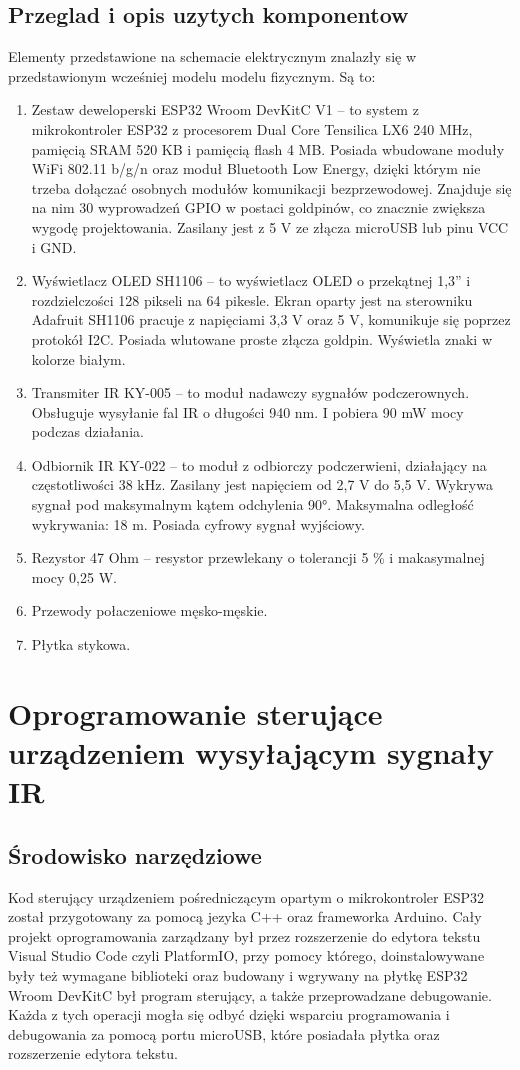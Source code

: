 \documentclass[12pt,twoside]{article}
\begin{document}
\subsection{Przeglad i opis uzytych komponentow}
Elementy przedstawione na schemacie elektrycznym znalazły się w przedstawionym wcześniej modelu modelu fizycznym. Są to:
\begin{enumerate}[label=\alph*), leftmargin=1.25cm]
   \item Zestaw deweloperski ESP32 Wroom DevKitC V1\cite{doitDevKitV1} -- to system z mikrokontroler ESP32 z procesorem Dual Core Tensilica LX6 240 MHz, pamięcią SRAM 520 KB i pamięcią flash 4 MB. Posiada wbudowane moduły WiFi 802.11 b/g/n oraz moduł Bluetooth Low Energy, dzięki którym nie trzeba dołączać osobnych modułów komunikacji bezprzewodowej. Znajduje się na nim 30 wyprowadzeń GPIO w postaci goldpinów, co znacznie zwiększa wygodę projektowania. Zasilany jest z 5 V ze złącza microUSB lub pinu VCC i GND.
   \item Wyświetlacz OLED SH1106\cite{sh1106} -- to wyświetlacz OLED o przekątnej 1,3'' i rozdzielczości 128 pikseli na 64 pikesle. Ekran oparty jest na sterowniku Adafruit SH1106 pracuje z napięciami 3,3 V oraz 5 V, komunikuje się poprzez protokół I2C. Posiada wlutowane proste złącza goldpin. Wyświetla znaki w kolorze białym.
   \item Transmiter IR KY-005\cite{ky005} -- to moduł nadawczy sygnałów podczerownych. Obsługuje wysyłanie fal IR o długości 940 nm. I pobiera 90 mW mocy podczas działania.
   \item Odbiornik IR KY-022\cite{ky022}  -- to moduł z odbiorczy podczerwieni, działający na częstotliwości 38 kHz. Zasilany jest napięciem od 2,7 V do 5,5 V. Wykrywa sygnał pod maksymalnym kątem odchylenia 90°. Maksymalna odległość wykrywania: 18 m. Posiada cyfrowy sygnał wyjściowy.
   \item Rezystor 47 Ohm -- resystor przewlekany o tolerancji 5 \% i makasymalnej mocy 0,25 W.
   \item Przewody połaczeniowe męsko-męskie.
   \item Płytka stykowa.
\end{enumerate}

\clearpage

\section{Oprogramowanie sterujące urządzeniem wysyłającym sygnały IR}
\subsection{Środowisko narzędziowe}
Kod sterujący urządzeniem pośredniczącym opartym o mikrokontroler ESP32 został przygotowany za pomocą jezyka C++ oraz frameworka Arduino. Cały projekt oprogramowania zarządzany był przez rozszerzenie do edytora tekstu Visual Studio Code czyli PlatformIO, przy pomocy którego, doinstalowywane były też wymagane biblioteki oraz budowany i wgrywany na płytkę ESP32 Wroom DevKitC był program sterujący, a także przeprowadzane debugowanie. Każda z tych operacji mogła się odbyć dzięki wsparciu programowania i debugowania za pomocą portu microUSB, które posiadała płytka oraz rozszerzenie edytora tekstu.
\end{document}
